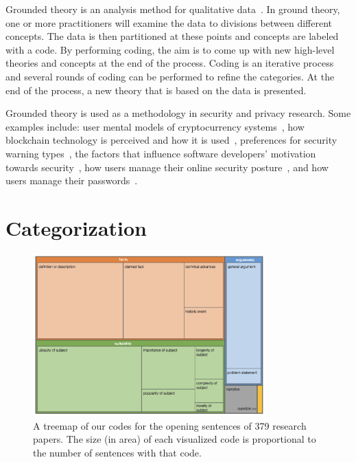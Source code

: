 \documentclass[sigconf,anonymous]{acmart}
\begin{document}
	Grounded theory is an analysis method for qualitative data~\cite{glaser1968discovery}. In ground theory, one or more practitioners will examine the data to divisions between different concepts. The data is then partitioned at these points and concepts are labeled with a code. By performing coding, the aim is to come up with new high-level theories and concepts at the end of the process. Coding is an iterative process and several rounds of coding can be performed to refine the categories. At the end of the process, a new theory that is based on the data is presented.
	
	Grounded theory is used as a methodology in security and privacy research. Some examples include: user mental models of cryptocurrency systems~\cite{mai2020user}, how blockchain technology is perceived and how it is used~\cite{ruoti2019blockchain}, preferences for security warning types~\cite{danilova2020one}, the factors that influence software developers' motivation towards security~\cite{assal2018motivations},  how users manage their online security posture~\cite{ruoti2017weighing}, and how users manage their passwords~\cite{stobert2014password}.
	
	\section{Categorization}
	
	\label{sec:categories}
	\begin{figure}[t]
		\centering
		\includegraphics[width=0.8\textwidth]{image.png}
		\caption{A treemap of our codes for the opening sentences of 379 research papers. The size (in area) of each visualized code is proportional to the number of sentences with that code.}
		\label{fig:treemap}
	\end{figure}
	
\end{document}
